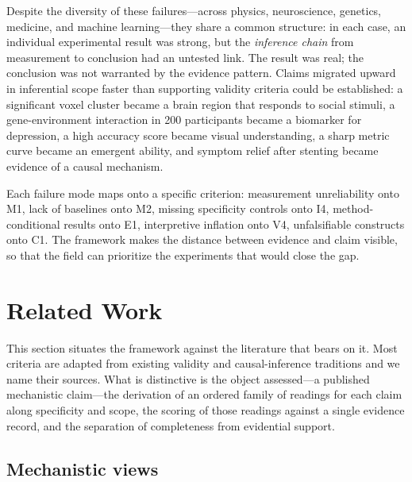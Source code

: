 \documentclass{article}
\begin{document}
Despite the diversity of these failures---across physics, neuroscience, genetics, medicine, and machine learning---they share a common structure: in each case, an individual experimental result was strong, but the \emph{inference chain} from measurement to conclusion had an untested link. The result was real; the conclusion was not warranted by the evidence pattern. Claims migrated upward in inferential scope faster than supporting validity criteria could be established: a significant voxel cluster became a brain region that responds to social stimuli, a gene-environment interaction in 200 participants became a biomarker for depression, a high accuracy score became visual understanding, a sharp metric curve became an emergent ability, and symptom relief after stenting became evidence of a causal mechanism.

Each failure mode maps onto a specific criterion: measurement unreliability onto M1, lack of baselines onto M2, missing specificity controls onto I4, method-conditional results onto E1, interpretive inflation onto V4, unfalsifiable constructs onto C1. The framework makes the distance between evidence and claim visible, so that the field can prioritize the experiments that would close the gap.


\section{Related Work}
\label{sec:related}

This section situates the framework against the literature that bears on it. Most criteria are adapted from existing validity and causal-inference traditions and we name their sources. What is distinctive is the object assessed---a published mechanistic claim---the derivation of an ordered family of readings for each claim along specificity and scope, the scoring of those readings against a single evidence record, and the separation of completeness from evidential support.

\subsection{Mechanistic views}
\label{sec:related-unit}
\end{document}
